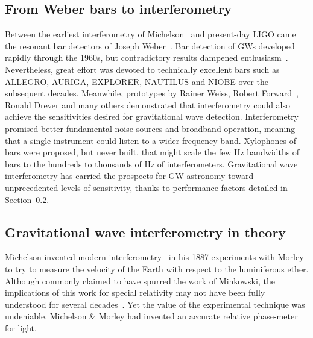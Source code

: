 
        \subsection{From Weber bars to interferometry}
        \label{bars_to_interferometry}

Between the earliest interferometry of Michelson~\cite{michelson} and present-day LIGO came the resonant bar detectors of Joseph Weber~\cite{Weber1960}.
Bar detection of GWs developed rapidly through the 1960s, but contradictory results dampened enthusiasm~\cite{Saulson,CollinsGravityShadow}.
Nevertheless, great effort was devoted to technically excellent bars such as ALLEGRO, AURIGA, EXPLORER, NAUTILUS and NIOBE over the subsequent decades.
Meanwhile, prototypes by Rainer Weiss, Robert Forward~\cite{Forward1978}, Ronald Drever and many others demonstrated that interferometry could also achieve the sensitivities desired for gravitational wave detection.
Interferometry promised better fundamental noise sources and broadband operation, meaning that a single instrument could listen to a wider frequency band.
Xylophones of bars were proposed, but never built, that might scale the few Hz bandwidths of bars to the hundreds to thousands of Hz of interferometers.
Gravitational wave interferometry has carried the prospects for GW astronomy toward unprecedented levels of sensitivity, thanks to performance factors detailed in Section~\ref{methods}.


        \subsection{Gravitational wave interferometry in theory}
        \label{methods}


	Michelson invented modern interferometry~\cite{michelson} in his 1887 experiments with Morley to try to measure the velocity of the Earth with respect to the luminiferous ether.
Although commonly claimed to have spurred the work of Minkowski, the implications of this work for special relativity may not have been fully understood for several decades~\cite{CollinsGravityGhost}.
Yet the value of the experimental technique was undeniable.
Michelson \& Morley had invented an accurate relative phase-meter for light.

